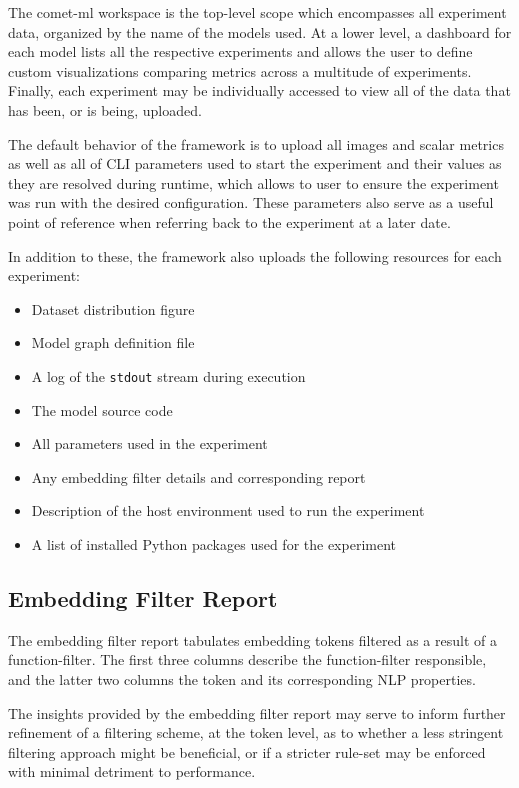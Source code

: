 \documentclass[../../fyp.tex]{subfiles}
\begin{document}
The comet-ml workspace is the top-level scope which encompasses all experiment data, organized by the name of the models used. At a lower level, a dashboard for each model lists all the respective experiments and allows the user to define custom visualizations comparing metrics across a multitude of experiments. Finally, each experiment may be individually accessed to view all of the data that has been, or is being, uploaded.

The default behavior of the framework is to upload all images and scalar metrics as well as all of CLI parameters used to start the experiment and their values as they are resolved during runtime, which allows to user to ensure the experiment was run with the desired configuration. These parameters also serve as a useful point of reference when referring back to the experiment at a later date. 

In addition to these, the framework also uploads the following resources for each experiment:
\begin{itemize}
\item Dataset distribution figure
\item Model graph definition file
\item A log of the \texttt{stdout} stream during execution
\item The model source code
\item All parameters used in the experiment
\item Any embedding filter details and corresponding report
\item Description of the host environment used to run the experiment 
\item A list of installed Python packages used for the experiment
\end{itemize}

\subsection{Embedding Filter Report}
The embedding filter report tabulates embedding tokens filtered as a result of a function-filter. The first three columns describe the function-filter responsible, and the latter two columns the token and its corresponding NLP properties. 

The insights provided by the embedding filter report may serve to inform further refinement of a filtering scheme, at the token level, as to whether a less stringent filtering approach might be beneficial, or if a stricter rule-set may be enforced with minimal detriment to performance. 
\end{document}
